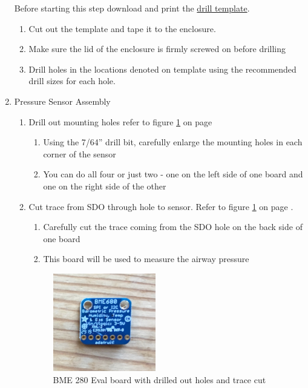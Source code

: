 \documentclass[11pt, letterpaper]{article}
\begin{document}
\begin{enumerate}
Before starting this step download and print the \href{https://github.com/PubInv/ventmon-ventilator-inline-test-monitor/blob/master/design/templates/bottomDrill03.pdf}{drill template}.

\begin{enumerate}[label=2.\arabic*]
\item
Cut out the template and tape it to the enclosure.
\item
Make sure the lid of the enclosure is firmly screwed on before drilling
\item
Drill holes in the locations denoted on template using the recommended drill sizes for each hole.
\end{enumerate}

\item
Pressure Sensor Assembly
\begin{enumerate}[label=3.\arabic*]
\item
Drill out mounting holes refer to figure \ref{fig:bme_1} on page \pageref{fig:bme_1}
\begin{enumerate}[label=3.1.\arabic*]
\item
Using the 7/64'' drill bit, carefully enlarge the mounting holes in each corner of the sensor
\item
You can do all four or just two - one on the left side of one board and one on the right side of the other
\end{enumerate}
\item
Cut trace from SDO through hole to sensor. Refer to figure \ref{fig:bme_1} on page \pageref{fig:bme_1}.
\begin{enumerate}[label=3.2.\arabic*]
\item
Carefully cut the trace coming from the SDO hole on the back side of one board
\item
This board will be used to measure the airway pressure
\end{enumerate}
\begin{figure}[H]
\label{fig:bme_1}
\centering
\includegraphics[width=0.45\textwidth]{images/bme_1.JPG}
\caption{BME 280 Eval board with drilled out holes and trace cut}
\end{figure}


\end{enumerate}
\end{enumerate}
\end{document}
